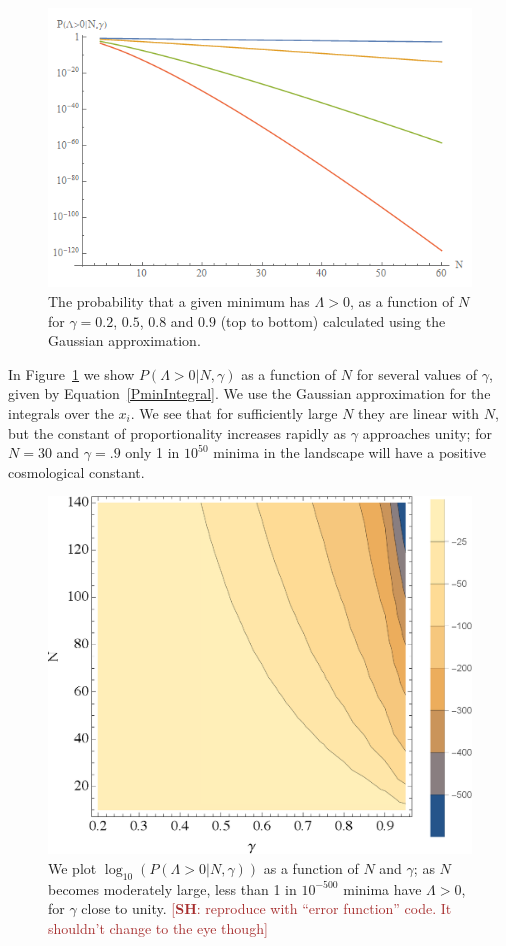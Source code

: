 \documentclass[12pt]{article}
\newcommand{\SH}[1]{\textcolor{brown}{[{\bf SH}: #1]}}
\begin{document}
\begin{figure} 
  \centering
  \includegraphics[width=.6 \linewidth]{pwithN.png}
  \caption{The probability that a given minimum has $\Lambda>0$, as a function of $N$ for $\gamma=0.2$, $0.5$, $0.8$ and $0.9$ (top to bottom) calculated using the Gaussian approximation.}
  \label{PVaryingWithNGaussian}
\end{figure}
  
In  Figure~\ref{PVaryingWithNGaussian} we show $P(\Lambda>0|N,\gamma)$ as a function of $N$ for several values of $\gamma$, given by Equation~\ref{PminIntegral}. We use the Gaussian approximation for the integrals over the $x_i$. We see that for sufficiently large $N$ they are linear with $N$, but the constant of proportionality increases rapidly as $\gamma$ approaches unity; for $N=30$ and $\gamma = .9$ only 1 in $10^{50}$ minima in the landscape will have a positive cosmological constant.


\begin{figure} 
  \centering
  \includegraphics[width=.6 \linewidth]{histo.eps}
  \caption{We plot $\log_{10}(P(\Lambda>0|N,\gamma))$ as a function of $N$ and $\gamma$; as $N$ becomes moderately large, less than 1 in $10^{-500}$ minima have $\Lambda>0$, for $\gamma$  close to unity.  \SH{reproduce with ``error function'' code. It shouldn't change to the eye though}}
  \label{fullcontourplot}
\end{figure}
\end{document}
